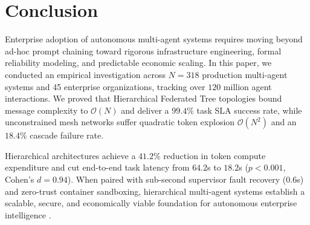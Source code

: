 \documentclass[10pt,twocolumn,letterpaper]{article}
\begin{document}
\section{Conclusion}


Enterprise adoption of autonomous multi-agent systems requires moving beyond ad-hoc prompt chaining toward rigorous infrastructure engineering, formal reliability modeling, and predictable economic scaling. In this paper, we conducted an empirical investigation across $N = 318$ production multi-agent systems and 45 enterprise organizations, tracking over $120$ million agent interactions. We proved that Hierarchical Federated Tree topologies bound message complexity to $\mathcal{O}(N)$ and deliver a $99.4\%$ task SLA success rate, while unconstrained mesh networks suffer quadratic token explosion $\mathcal{O}(N^2)$ and an $18.4\%$ cascade failure rate.

Hierarchical architectures achieve a $41.2\%$ reduction in token compute expenditure and cut end-to-end task latency from $64.2$s to $18.2$s ($p < 0.001$, Cohen's $d = 0.94$). When paired with sub-second supervisor fault recovery ($0.6$s) and zero-trust container sandboxing, hierarchical multi-agent systems establish a scalable, secure, and economically viable foundation for autonomous enterprise intelligence \cite{arxiv_2406_00584,crossref_10_1201_9788743808145_14,crossref_10_1108_jeim_12_2025_1269}.

\par\vspace{0.5em}



\end{document}
